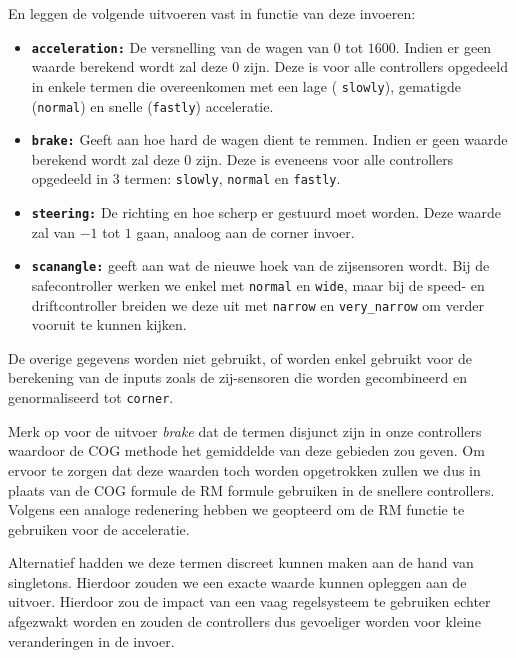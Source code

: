 En leggen de volgende uitvoeren vast in functie van deze invoeren:
\begin{itemize}
\item \texttt{\textbf{acceleration:}} De versnelling van de wagen van $0$ tot $1600$. Indien er geen waarde berekend wordt zal deze $0$ zijn. Deze is voor alle controllers opgedeeld in enkele termen die overeenkomen met een lage ( \texttt{slowly}), gematigde (\texttt{normal}) en snelle (\texttt{fastly}) acceleratie.
\item \texttt{\textbf{brake:}} Geeft aan hoe hard de wagen dient te remmen. Indien er geen waarde berekend wordt zal deze $0$ zijn. Deze is eveneens voor alle controllers opgedeeld in 3 termen: \texttt{slowly}, \texttt{normal} en \texttt{fastly}.
\item \texttt{\textbf{steering:}} De richting en hoe scherp er gestuurd moet worden. Deze waarde zal van $-1$ tot $1$ gaan, analoog aan de corner invoer.
\item \texttt{\textbf{scanangle:}} geeft aan wat de nieuwe hoek van de 
zijsensoren wordt. Bij de safecontroller werken we enkel met \texttt{normal} en 
\texttt{wide}, maar bij de speed- en driftcontroller breiden we deze uit met 
\texttt{narrow} en \texttt{very\_narrow} om verder vooruit te kunnen kijken.
\end{itemize}

De overige gegevens worden niet gebruikt, of worden enkel gebruikt voor de 
berekening van de inputs zoals de zij-sensoren die worden gecombineerd en 
genormaliseerd tot \texttt{corner}.

Merk op voor de uitvoer \emph{brake} dat de termen disjunct zijn in onze controllers waardoor de COG methode het gemiddelde van deze gebieden zou geven. Om ervoor te zorgen dat deze waarden toch worden opgetrokken zullen we dus in plaats van de COG formule de RM formule gebruiken in de snellere controllers. Volgens een analoge redenering hebben we geopteerd om de RM functie te gebruiken voor de acceleratie.

Alternatief hadden we deze termen discreet kunnen maken aan de hand van singletons. Hierdoor zouden we een exacte waarde kunnen opleggen aan de uitvoer. Hierdoor zou de impact van een vaag regelsysteem te gebruiken echter afgezwakt worden en zouden de controllers dus gevoeliger worden voor kleine veranderingen in de invoer.




